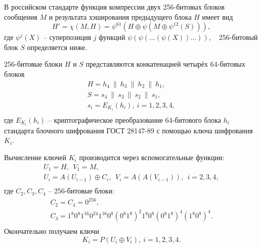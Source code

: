 В российском стандарте функция компрессии двух 256-битовых блоков сообщения $M$ и результата хэширования предыдущего блока $H$ имеет вид
\[
    H' = \chi(M, H) = \psi^{61}(H \oplus \psi(M \oplus \psi^{12}(S))),
\]
где $\psi^j(X)$ -- суперпозиция $j$ функций $\psi( \psi( \dots ( \psi( X)) \dots ))$, ~ 256-битовый блок $S$ определяется ниже.

256-битовые блоки $H$ и $S$ представляются конкатенацией четырёх 64-битовых блоков
\[ \begin{array}{l}
    H = h_4 ~\|~ h_3 ~\|~ h_2 ~\|~ h_1, \\
    S = s_4 ~\|~ s_3 ~\|~ s_2 ~\|~ s_1, \\
    s_i = E_{K_i}( h_i), ~ i = 1, 2, 3, 4, \\
\end{array} \]
где $E_{K_i}( h_i)$ -- криптографическое преобразование 64-битового блока $h_i$ стандарта блочного шифрования ГОСТ 28147-89 с помощью ключа шифрования $K_i$.

Вычисление ключей $K_i$ производится через вспомогательные функции:
\[ \begin{array}{c}
    U_1 = H, ~~ V_1 = M, \\
    U_i = A(U_{i-1}) \oplus C_i, ~~ V_i = A(A(V_{i-1})), ~~ i = 2, 3, 4, \\
\end{array} \]
где $C_2, C_3, C_4$ -- 256-битовые блоки:
\[ \begin{array}{c}
    C_2 = C_4 = 0^{256}, \\
    C_3 = 1^8 0^8 1^{16} 0^{24} 1^{16} 0^8 (0^8 1^8)^2 1^8 0^8 (0^8 1^8)^4 (1^8 0^8)^4. \\
\end{array} \]
Окончательно получаем ключи
\[
    K_i = P(U_i \oplus V_i), ~ i = 1,2,3,4.
\]

